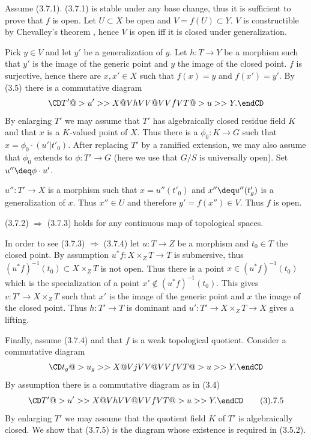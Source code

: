 \demop Assume (3.7.1). (3.7.1) is stable under any base change, thus it is
sufficient to prove that $f$ is open. Let $U\subset X$ be open and
$V=f(U)\subset Y$. $V$ is constructible by Chevalley's theorem \cite{EGA71,
I.7.1.4}, hence
$V$ is open iff it is closed under generalization.

Pick $y\in V$ and let $y'$ be a generalization of $y$. Let $h:T\to Y$ be a
morphism such that $y'$ is the
image of the generic point and $y$ the
image of the closed point.
$f$ is surjective, hence there are  $x,x'\in X$ such that
$f(x)=y$ and $f(x')=y'$.  By (3.5) there is a commutative diagram
$$
\CD
T'@>u'>> X\\
@VhVV @VVfV\\
T@>u>> Y.
\endCD
$$
By enlarging $T'$ we may assume that $T'$ has algebraically closed residue
field $K$ and that
$x$ is a $K$-valued point of $X$.  Thus there is a $\phi_0:K\to G$ such that
$x=\phi_0\cdot (u'|t'_0)$. After replacing $T'$ by a ramified extension,  we
may also assume that $\phi_0$ extends to $\phi:T'\to G$ (here we use that
$G/S$ is universally open). Set
$u''\deq
\phi\cdot u'$.

 $u'':T'\to X$ is a morphism such that  $x=u''(t'_0)$ and $x''\deq u''(t'_g)$
is a generalization of $x$. Thus $x''\in U$ and therefore $y'=f(x'')\in V$.
Thus $f$ is open.





(3.7.2) $\Rightarrow$ (3.7.3) holds for any continuous map of
topological spaces.

In order to see (3.7.3) $\Rightarrow$ (3.7.4)  let $u:T\to Z$ be a morphism
and
$t_0\in T$ the closed point. By assumption $u^*f:X\times_ZT\to T$ is
submersive, thus
$(u^*f)^{-1}(t_0)\subset X\times_ZT$ is not open. Thus there is a point
$x\in (u^*f)^{-1}(t_0)$ which is the specialization of a point $x'\not\in
(u^*f)^{-1}(t_0)$.  This gives  $v:T'\to X\times_ZT$  such that $x'$ is the
image of the generic point and $x$ the
image of the closed point. Thus $h:T'\to T$ is dominant and
$u':T'\to X\times_ZT\to X$ gives a lifting.


Finally,  assume (3.7.4) and that $f$ is a  weak topological
quotient. Consider a commutative diagram
$$
\CD
t_g@>u_g>> X\\
@VjVV @VVfV\\
T@>u>> Y.
\endCD
$$
By assumption there is a commutative diagram as in (3.4)
$$
\CD
T'@>u'>> X\\
@VhVV @VVfV\\
T@>u>> Y.
\endCD\tag 3.7.5
$$
By enlarging $T'$ we may assume that the quotient field $K$ of $T'$ is
algebraically closed. We show that (3.7.5) is the diagram whose existence is
required in (3.5.2).

